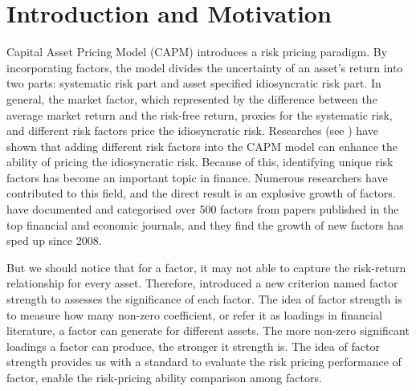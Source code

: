 \chapter{Introduction and Motivation}
Capital Asset Pricing Model (CAPM) \cite{Sharpe1964, Lintner1965, Black1972} introduces a risk pricing paradigm.
By incorporating factors, the model divides the uncertainty of an asset's return into two parts: systematic risk part and asset specified idiosyncratic risk part.
In general, the market factor, which represented by the difference between the average market return and the risk-free return, proxies for the systematic risk, and different risk factors price the idiosyncratic risk.
Researches (see ) have shown that adding different risk factors into the CAPM model can enhance the ability of pricing the idiosyncratic risk.
Because of this, identifying unique risk factors has become an important topic in finance.
Numerous researchers have contributed to this field, and the direct result is an explosive growth of factors.
  have documented and categorised over 500 factors from papers published in the top financial and economic journals, and they find the growth of new factors has sped up since 2008. 
 
But we should notice that for a factor, it may not able to capture the risk-return relationship for every asset.
Therefore,  introduced a new criterion named factor strength to assesses the significance of each factor.
The idea of factor strength is to measure how many non-zero coefficient, or refer it as loadings in financial literature, a factor can generate for different assets.
The more non-zero significant loadings a factor can produce, the stronger it strength is.
The idea of factor strength provides us with a standard to evaluate the risk pricing performance of factor, enable the risk-pricing ability comparison among factors.

